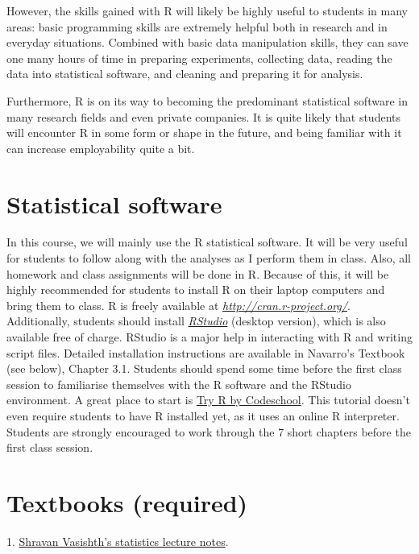 \documentclass[a4paper,12pt]{article}
\begin{document}
	However, the skills gained with R will likely be highly useful to students in many areas: basic programming skills are extremely helpful both in research and in everyday situations. Combined with basic data manipulation skills, they can save one many hours of time in preparing experiments, collecting data, reading the data into statistical software, and cleaning and preparing it for analysis. 
	
	Furthermore, R is on its way to becoming the predominant statistical software in many research fields and even private companies. It is quite likely that students will encounter R in some form or shape in the future, and being familiar with it can increase employability quite a bit.
	
	
	\setlength{\parindent}{0cm}
	
	\section{Statistical software}
	In this course, we will mainly use the R statistical software. It will be very useful for students to follow along with the analyses as I perform them in class. Also, all homework and class assignments will be done in R. Because of this, it will be highly recommended for students to install R on their laptop computers and bring them to class. R is freely available at \href{http://cran.r-project.org/}{\textit{http://cran.r-project.org/}}. Additionally, students should install \href{http://www.rstudio.com/products/RStudio/#Desk}{\textit{RStudio}} (desktop version), which is also available free of charge. RStudio is a major help in interacting with R and writing script files. Detailed installation instructions are available in Navarro's Textbook (see below), Chapter 3.1.
	Students should spend some time before the first class session to familiarise themselves with the R software and the RStudio environment. A great place to start is \href{http://tryr.codeschool.com/}{Try R by Codeschool}. This tutorial doesn't even require students to have R installed yet, as it uses an online R interpreter. Students are strongly encouraged to work through the 7 short chapters before the first class session.
	
	
	\section{Textbooks (required)} 
	1.  \href{https://github.com/vasishth/Statistics-lecture-notes-Potsdam/blob/master/IntroductoryStatistics/StatisticsNotesVasishth.pdf}{Shravan Vasishth's statistics  lecture notes}. \\
\end{document}
